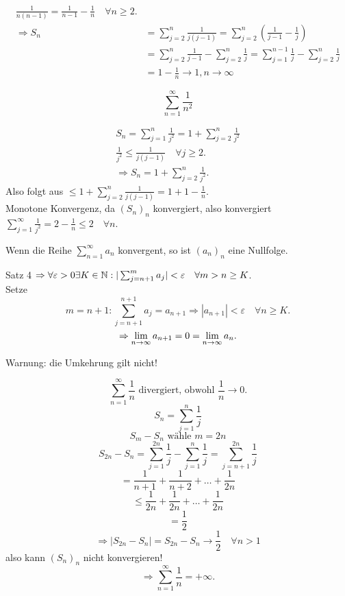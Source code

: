 \documentclass[../ana1.tex]{subfiles}
\begin{document}
\begin{bew}
	\begin{align*}
		\frac{1}{n(n-1)} =\frac{1}{n-1} - \frac{1}{n} \quad\forall n\geq 2.\\
		\Rightarrow S_n &= \sum_{j=2}^{n} \frac{1}{j(j-1)} = \sum_{j=2}^{n} \left( \frac{1}{j-1} - \frac{1}{j} \right)\\
		&= \sum_{j=2}^{n} \frac{1}{j-1} - \sum_{j=2}^{n} \frac{1}{j} = \sum_{j=1}^{n-1}\frac{1}{j} - \sum_{j=2}^{n}\frac{1}{j}\\
		&= 1 - \frac{1}{n} \rightarrow 1, n\rightarrow \infty
	\end{align*}
\end{bew}
\begin{bsp}
	\[ \sum_{n=1}^{\infty} \frac{1}{n^2} \]
\end{bsp}
\begin{bew}
	\begin{align*}
		S_n = \sum_{j=1}^{n}\frac{1}{j^2} = 1 + \sum_{j=2}^{n} \frac{1}{j^2}\\
		\frac{1}{j^2} \leq \frac{1}{j(j-1)} \quad \forall j\geq 2.\\
		\Rightarrow S_n = 1 + \sum_{j=2}^{n} \frac{1}{j^2}.
	\end{align*}
	Also folgt aus \( \leq 1 + \sum_{j=2}^{n} \frac{1}{j(j-1)} = 1 + 1 - \frac{1}{n} \).\\
	Monotone Konvergenz, da \((S_n)_n\) konvergiert, also konvergiert \(\sum_{j=1}^{\infty} \frac{1}{j^2} = 2 - \frac{1}{n} \leq 2 \quad\forall n \).
\end{bew}
\begin{kor}
	Wenn die Reihe \(\sum_{n=1}^{\infty} a_n\) konvergent, so ist \((a_n)_n\) eine Nullfolge.
\end{kor}
\begin{bew}
	Satz 4 \( \Rightarrow \forall \varepsilon >0 \exists K\in\mathbb{N}:|\sum_{j=n+1}^{m}a_j| < \varepsilon \quad \forall m>n\geq K \).\\
	Setze \[ m=n+1 : \sum_{j=n+1}^{n+1} a_j = a_{n+1} \Rightarrow |a_{n+1}|<\varepsilon \quad \forall n\geq K. \]
	\[ \Rightarrow \lim\limits_{n\rightarrow\infty}a_{n+1}=0=\lim\limits_{n\rightarrow\infty}a_n. \]
\end{bew}
\begin{bem}
	Warnung: die Umkehrung gilt nicht!
\end{bem}
\begin{bsp}
	\[ \sum_{n=1}^{\infty} \frac{1}{n} \text{ divergiert, obwohl } \frac{1}{n} \rightarrow 0. \]
	\[ S_n = \sum_{j=1}^{n}\frac{1}{j} \]
	\[ S_m -S_n \text{ wähle }m=2n \]
	\[ S_{2n} - S_n = \sum_{j=1}^{2n}\frac{1}{j} - \sum_{j=1}^{n}\frac{1}{j} = \sum_{j=n+1}^{2n}\frac{1}{j} \]
	\[ = \frac{1}{n+1} + \frac{1}{n+2} + \dots + \frac{1}{2n} \]
	\[ \leq \frac{1}{2n} + \frac{1}{2n} + \dots + \frac{1}{2n} \]
	\[ = \frac{1}{2} \]
	\[ \Rightarrow |S_{2n}-S_n| = S_{2n}-S_n \rightarrow \frac{1}{2} \quad\forall n>1 \]
	also kann \((S_n)_n\) nicht konvergieren!
	\[ \Rightarrow \sum_{n=1}^{\infty} \frac{1}{n} = +\infty. \]
\end{bsp}
\end{document}
